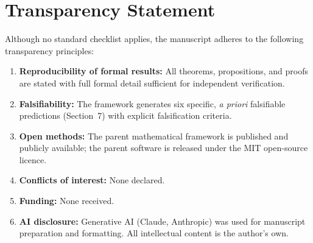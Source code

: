 \documentclass[12pt]{article}
\begin{document}
\bigskip

\section*{Transparency Statement}

Although no standard checklist applies, the manuscript adheres to the following transparency principles:

\begin{enumerate}
    \item \textbf{Reproducibility of formal results:} All theorems, propositions, and proofs are stated with full formal detail sufficient for independent verification.
    \item \textbf{Falsifiability:} The framework generates six specific, \emph{a priori} falsifiable predictions (Section~7) with explicit falsification criteria.
    \item \textbf{Open methods:} The parent mathematical framework is published and publicly available; the parent software is released under the MIT open-source licence.
    \item \textbf{Conflicts of interest:} None declared.
    \item \textbf{Funding:} None received.
    \item \textbf{AI disclosure:} Generative AI (Claude, Anthropic) was used for manuscript preparation and formatting.  All intellectual content is the author's own.
\end{enumerate}
\end{document}
